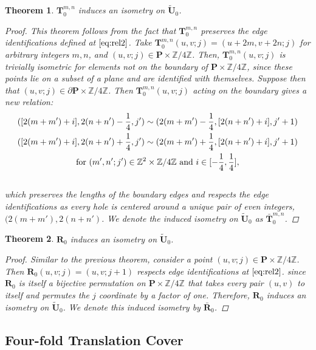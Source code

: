\documentclass[]{article}
\newtheorem{thm}{Theorem}[subsection]
\begin{document}
\begin{thm}$\mathbf{T}^{m,n}_{0}$ induces an isometry on $\tilde{\mathbf{U}}_0$.
\begin{proof}
This theorem follows from the fact that $\mathbf{T}^{m,n}_{0}$ preserves the edge identifications defined at $\eqref{eq:rel2}$. Take $\mathbf{T}^{m,n}_{0}(u,v;j)=(u+2m,v+2n;j)$ for arbitrary integers $m,n$, and $(u,v;j)\in\mathbf{P}\times\mathbb{Z}/4\mathbb{Z}$. Then, $\mathbf{T}^{m,n}_{0}(u,v;j)$ is trivially isometric for elements not on the boundary of $\mathbf{P}\times\mathbb{Z}/4\mathbb{Z}$, since these points lie on a subset of a plane and are identified with themselves. Suppose then that $(u,v;j)\in\partial\mathbf{P}\times\mathbb{Z}/4\mathbb{Z}$. Then $\mathbf{T}^{m,n}_{0}(u,v;j)$ acting on the boundary gives a new relation:
\begin{multline*}
([2(m+m')+i], 2(n+n')-\frac{1}{4},j')\sim(2(m+m')-\frac{1}{4},[2(n+n')+i],j'+1)\\
([2(m+m')+i], 2(n+n')+\frac{1}{4},j')\sim(2(m+m')+\frac{1}{4},[2(n+n')+i],j'+1)\\
\vspace{0.2in}\text{for } (m',n';j') \in \mathbb{Z}^{2}\times\mathbb{Z}/4\mathbb{Z}\text{ and }i\in[-\frac{1}{4},\frac{1}{4}],
\end{multline*}
which preserves the lengths of the boundary edges and respects the edge identifications as every hole is centered around a unique pair of even integers, $(2(m+m'),2(n+n')$. We denote the induced isometry on $\tilde{\mathbf{U}}_0$ as $\bar{\mathbf{T}}^{m,n}_{0}$.
\end{proof}
\end{thm}

\begin{thm}$\mathbf{R}_{0}$ induces an isometry on $\tilde{\mathbf{U}}_0$.
\begin{proof}
Similar to the previous theorem, consider a point $(u,v;j)\in\mathbf{P}\times\mathbb{Z}/4\mathbb{Z}$. Then $\mathbf{R}_{0}(u,v;j)=(u,v;j+1)$ respects edge identifications at $\eqref{eq:rel2}$. since $\mathbf{R}_{0}$ is itself a bijective permutation on $\mathbf{P}\times\mathbb{Z}/4\mathbb{Z}$ that takes every pair $(u,v)$ to itself and permutes the $j$ coordinate by a factor of one. Therefore, $\mathbf{R}_{0}$ induces an isometry on $\tilde{\mathbf{U}}_0$. We denote this induced isometry by $\bar{\mathbf{R}}_{0}$.
\end{proof}
\end{thm}

\subsection{Four-fold Translation Cover}
\end{document}
